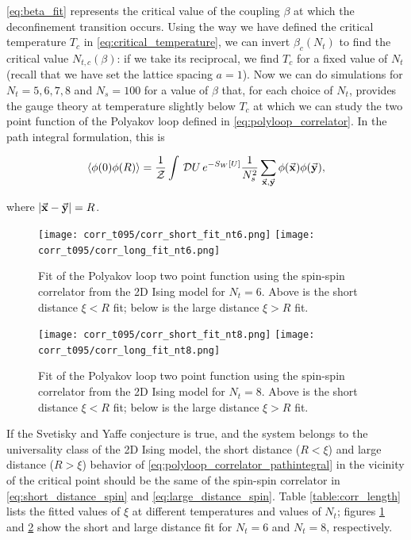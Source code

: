 \documentclass[reqno,12pt]{article}
\numberwithin{equation}{section}
\newcommand{\D}[1]{\,\mathcal{D}#1\,}
\newcommand{\Z}{\mathcal{Z}}
\begin{document}
\eqref{eq:beta_fit} represents the critical value of the coupling $\beta$ at which the deconfinement transition occurs.
Using the way we have defined the critical temperature $T_c$ in \eqref{eq:critical_temperature}, we can invert $\beta_c(N_t)$
to find the critical value $N_{t,c}(\beta)$: if we take its reciprocal, we find $T_c$ for a fixed value of $N_t$ (recall
that we have set the lattice spacing $a = 1$). Now we can do simulations for $N_t = 5, 6, 7, 8$ and $N_s = 100$ for a value of
$\beta$ that, for each choice of $N_t$, provides the gauge theory at temperature slightly below $T_c$ at which we can study
the two point function of the Polyakov loop defined in \eqref{eq:polyloop_correlator}. In the path integral formulation,
this is

\begin{equation} \label{eq:polyloop_correlator_pathintegral}
	\expval{\phi(0) \phi(R)} = \frac{1}{\Z} \int \D U e^{-S_W[U]} \frac{1}{N_s^2} \sum_{\va{x}, \va{y}}\phi(\va{x}) \phi(\va{y}),
\end{equation}

where $|\va{x} - \va{y}| = R$.

\begin{figure}[h]
	\centering
	\texttt{[image: corr\_t095/corr\_short\_fit\_nt6.png]}
	\texttt{[image: corr\_t095/corr\_long\_fit\_nt6.png]}
	\caption[Polyakov loop correlator fit for $N_t=6$]{
		Fit of the Polyakov loop two point function using the spin-spin correlator from the 2D Ising model
		for $N_t = 6$. Above is the short distance $\xi < R$ fit; below is the large distance $\xi > R$ fit.
	}
\label{fig:corr_fit_nt6}
\end{figure}

\begin{figure}[h]
	\centering
	\texttt{[image: corr\_t095/corr\_short\_fit\_nt8.png]}
	\texttt{[image: corr\_t095/corr\_long\_fit\_nt8.png]}
	\caption[Polyakov loop correlator fit for $N_t=8$]{
		Fit of the Polyakov loop two point function using the spin-spin correlator from the 2D Ising model
		for $N_t = 8$. Above is the short distance $\xi < R$ fit; below is the large distance $\xi > R$ fit.
	}
\label{fig:corr_fit_nt8}
\end{figure}


If the Svetisky and Yaffe conjecture is true, and the system belongs to the universality class of the 2D Ising model, the 
short distance ($R < \xi$) and large distance ($R > \xi$) behavior of \eqref{eq:polyloop_correlator_pathintegral} 
in the vicinity of the critical point should be the same of the spin-spin
correlator in \eqref{eq:short_distance_spin} and \eqref{eq:large_distance_spin}. Table \ref{table:corr_length} lists the fitted
values of $\xi$ at different temperatures and values of $N_t$; figures \ref{fig:corr_fit_nt6} and
\ref{fig:corr_fit_nt8} show the short and large distance fit for $N_t = 6$ and $N_t = 8$, respectively.
\end{document}
